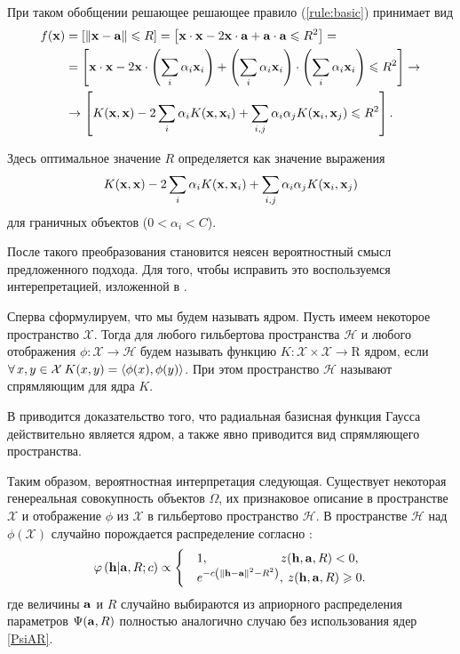 При таком обобщении решающее решающее правило (\ref{rule:basic}) принимает вид 
\begin{align}
	\label{rule:kernel}
	f(\boldsymbol{\mathbf{x}}) 
		&= 	\left[\left\|{\boldsymbol{\mathbf{x}}-\boldsymbol{\mathbf{a}}}\right\| \leqslant R\right] 
		= 	\left[\boldsymbol{\mathbf{x}}\cdot\boldsymbol{\mathbf{x}} - 2\boldsymbol{\mathbf{x}}\cdot\boldsymbol{\mathbf{a}} + \boldsymbol{\mathbf{a}}\cdot\boldsymbol{\mathbf{a}} \leqslant R^2\right] = \notag \\
		&= 	\left[\boldsymbol{\mathbf{x}}\cdot\boldsymbol{\mathbf{x}} - 2\boldsymbol{\mathbf{x}}\cdot\left(\sum\limits_{i} \alpha_i \boldsymbol{\mathbf{x}}_i\right) + \left(\sum\limits_{i} \alpha_i \boldsymbol{\mathbf{x}}_i\right)\cdot\left(\sum\limits_{i} \alpha_i \boldsymbol{\mathbf{x}}_i\right) \leqslant R^2\right] \to \notag \\
		&\to \left[K(\boldsymbol{\mathbf{x}},\boldsymbol{\mathbf{x}}) - 2\sum\limits_{i} \alpha_i K(\boldsymbol{\mathbf{x}}, \boldsymbol{\mathbf{x}}_i) + \sum\limits_{i,j} \alpha_i\alpha_jK(\boldsymbol{\mathbf{x}}_i,\boldsymbol{\mathbf{x}}_j) \leqslant R^2\right].
\end{align}

Здесь оптимальное значение $R$ определяется как значение выражения $$K(\boldsymbol{\mathbf{x}},\boldsymbol{\mathbf{x}}) - 2\sum\limits_{i} \alpha_i K(\boldsymbol{\mathbf{x}}, \boldsymbol{\mathbf{x}}_i) + \sum\limits_{i,j} \alpha_i\alpha_jK(\boldsymbol{\mathbf{x}}_i,\boldsymbol{\mathbf{x}}_j)$$ для граничных объектов ($0<\alpha_i<C$).

После такого преобразования становится неясен вероятностный смысл предложенного подхода. Для того, чтобы исправить это воспользуемся интерепретацией, изложенной в \cite{Markov}. 

Сперва сформулируем, что мы будем называть ядром. Пусть имеем некоторое пространство $\mathcal X$. Тогда для любого гильбертова пространства $\mathcal H$ и любого отображения $\phi \colon \mathcal X \to \mathcal H$ будем называть функцию $K\colon \mathcal X\times\mathcal X\to \mathrm R$ ядром, если $\forall\,x,y\in \mathcal X\: K(x,y) =\left\langle\phi(x),\phi(y)\right\rangle$. При этом пространство $\mathcal H$ называют спрямляющим для ядра $K$.

В \cite{Steinwart} приводится доказательство того, что радиальная базисная функция Гаусса действительно является ядром, а также явно приводится вид спрямляющего пространства.

Таким образом, вероятностная интерпретация следующая. Существует некоторая генереальная совокупность объектов $\Omega$, их признаковое описание в пространстве $\mathcal X$ и отображение $\phi$ из $\mathcal X$ в гильбертово пространство $\mathcal H$. В пространстве $\mathcal H$ над $\phi(\mathcal X)$ случайно порождается распределение согласно \label{PhiXARC}:
\begin{equation}
	\label{PhiHARC}
	\varphi \left( {\boldsymbol{\mathbf{h}} | \boldsymbol{\mathbf{a}},R;c} \right) \propto
		\begin{cases}
			&1, 		\qquad\qquad\qquad  	\! 	z(\boldsymbol{\mathbf{h}},\boldsymbol{\mathbf{a}},R) < 0, \\
			&e^{-c \left(\left\|{\boldsymbol{\mathbf{h}}-\boldsymbol{\mathbf{a}}}\right\|^2-R^2\right)}, 	\:	z(\boldsymbol{\mathbf{h}},\boldsymbol{\mathbf{a}},R) \geqslant 0.
		\end{cases}
\end{equation}
где величины $\boldsymbol{\mathbf{a}}$ и $R$ случайно выбираются из априорного распределения параметров $\Psi(\boldsymbol{\mathbf{a}},R)$ полностью аналогично случаю без использования ядер \ref{PsiAR}.
